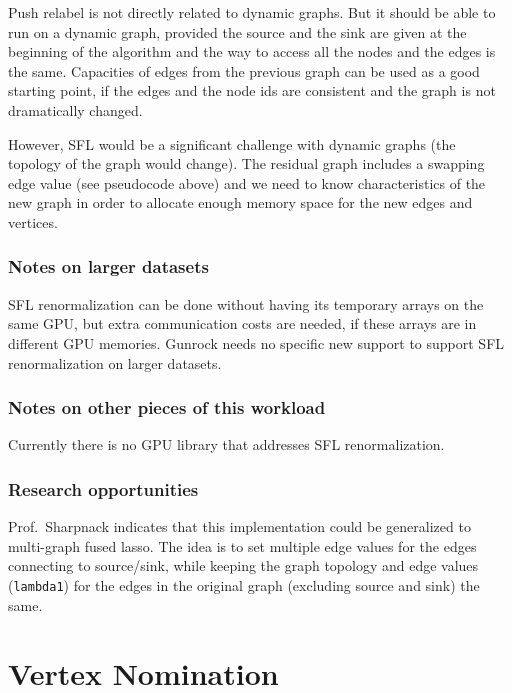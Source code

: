 \documentclass[10pt,oneside]{memoir}
\begin{document}
Push relabel is not directly related to dynamic graphs. But it should be
able to run on a dynamic graph, provided the source and the sink are
given at the beginning of the algorithm and the way to access all the
nodes and the edges is the same. Capacities of edges from the previous
graph can be used as a good starting point, if the edges and the node
ids are consistent and the graph is not dramatically changed.

However, SFL would be a significant challenge with dynamic graphs (the
topology of the graph would change). The residual graph includes a
swapping edge value (see pseudocode above) and we need to know
characteristics of the new graph in order to allocate enough memory
space for the new edges and vertices.

\hypertarget{notes-on-larger-datasets-8}{%
\subsection{Notes on larger datasets}\label{notes-on-larger-datasets-8}}

SFL renormalization can be done without having its temporary arrays on
the same GPU, but extra communication costs are needed, if these arrays
are in different GPU memories. Gunrock needs no specific new support to
support SFL renormalization on larger datasets.

\hypertarget{notes-on-other-pieces-of-this-workload-8}{%
\subsection{Notes on other pieces of this
workload}\label{notes-on-other-pieces-of-this-workload-8}}

Currently there is no GPU library that addresses SFL renormalization.

\hypertarget{research-opportunities}{%
\subsection{Research opportunities}\label{research-opportunities}}

Prof.~Sharpnack indicates that this implementation could be generalized
to multi-graph fused lasso. The idea is to set multiple edge values for
the edges connecting to source/sink, while keeping the graph topology
and edge values (\texttt{lambda1}) for the edges in the original graph
(excluding source and sink) the same.

\hypertarget{vertex-nomination-1}{%
\chapter{Vertex Nomination}\label{vertex-nomination-1}}
\end{document}
